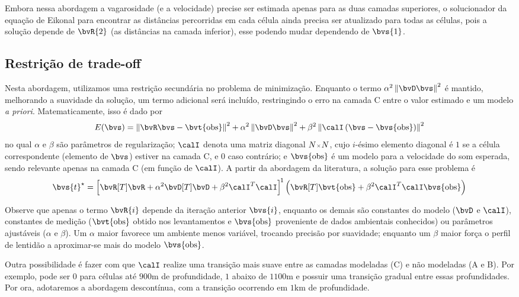 Embora nessa abordagem a vagarosidade (e a velocidade) precise ser estimada apenas para as duas camadas superiores, o solucionador da equação de Eikonal para encontrar as distâncias percorridas em cada célula ainda precisa ser atualizado para todas as células, pois a solução depende de $\bvR{2}$ (as distâncias na camada inferior), esse podendo mudar dependendo de $\bvs{1}$.

\subsection{Restrição de trade-off}

Nesta abordagem, utilizamos uma restrição secundária no problema de minimização. Enquanto o termo $\alpha^2 \norm{\bvD \bvs}^2$ é mantido, melhorando a suavidade da solução, um termo adicional será incluído, restringindo o erro na camada C entre o valor estimado e um modelo \textit{a priori}. Matematicamente, isso é dado por
\begin{equation}
	E(\bvs) = \norm{\bvR \bvs - \bvt{\obs}}^2 + \alpha^2 \norm{\bvD \bvs}^2 + \beta^2 \norm{\calI\pts{\bvs - \bvs{\obs}}}^2
\end{equation}
no qual $\alpha$ e $\beta$ são parâmetros de regularização; $\calI$ denota uma matriz diagonal $\sz{N}{N}$, cujo $i$-ésimo elemento diagonal é $1$ se a célula correspondente (elemento de $\bvs$) estiver na camada C, e $0$ caso contrário; e $\bvs{\obs}$ é um modelo para a velocidade do som esperada, sendo relevante apenas na camada C (em função de $\calI$). A partir da abordagem da literatura, a solução para esse problema é
\begin{equation}
	\opt{\bvs{t}} = \inv*{\bvR[T] \bvR + \alpha^2 \bvD[T] \bvD + \beta^2 \tr{\calI} \calI} \pts{\bvR[T] \bvt{\obs} + \beta^2 \tr{\calI}\calI \bvs{\obs}}
\end{equation}

Observe que apenas o termo $\bvR{i}$ depende da iteração anterior $\bvs{i}$, enquanto os demais são constantes do modelo ($\bvD$ e $\calI$), constantes de medição ($\bvt{\obs}$ obtido nos levantamentos e $\bvs{\obs}$ proveniente de dados ambientais conhecidos) ou parâmetros ajustáveis ($\alpha$ e $\beta$). Um $\alpha$ maior favorece um ambiente menos variável, trocando precisão por suavidade; enquanto um $\beta$ maior força o perfil de lentidão a aproximar-se mais do modelo $\bvs{\obs}$.

Outra possibilidade é fazer com que $\calI$ realize uma transição mais suave entre as camadas modeladas (C) e não modeladas (A e B). Por exemplo, pode ser $0$ para células até $900\si{\meter}$ de profundidade, $1$ abaixo de $1100\si{\meter}$ e possuir uma transição gradual entre essas profundidades. Por ora, adotaremos a abordagem descontínua, com a transição ocorrendo em $1\si{\kilo\meter}$ de profundidade.

